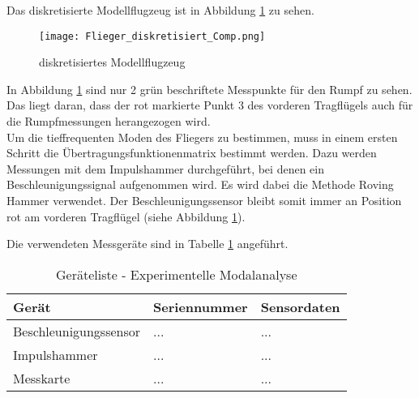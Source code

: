     \noindent
    Das diskretisierte Modellflugzeug ist in Abbildung
    \ref{fig: Flieger_diskretisiert} zu sehen.

    \begin{figure}[H]
        \centering
        \texttt{[image: Flieger\_diskretisiert\_Comp.png]}
        \caption{diskretisiertes Modellflugzeug}
        \label{fig: Flieger_diskretisiert}
    \end{figure}

    \noindent
    In Abbildung \ref{fig: Flieger_diskretisiert} sind nur 2 grün beschriftete
    Messpunkte für den Rumpf zu sehen. Das liegt daran, dass der rot markierte
    Punkt 3 des vorderen Tragflügels auch für die Rumpfmessungen herangezogen
    wird.
    \\

    \noindent
    Um die tieffrequenten Moden des Fliegers zu bestimmen, muss in einem ersten
    Schritt die Übertragungsfunktionenmatrix bestimmt werden. Dazu werden
    Messungen mit dem Impulshammer durchgeführt, bei denen ein
    Beschleunigungssignal aufgenommen wird. Es wird dabei die Methode Roving
    Hammer verwendet. Der Beschleunigungssensor bleibt somit immer an Position
     rot\grqq \hspace{0.05cm} am vorderen Tragflügel (siehe Abbildung
    \ref{fig: Flieger_diskretisiert}).

    \noindent
    Die verwendeten Messgeräte sind in Tabelle \ref{tab: Geräteliste_EMA}
    angeführt.

    \begin{table}[H]
        \centering
        \begin{tabular}{|l|l|l|}
            \hline
            \textbf{Gerät}  &   \textbf{Seriennummer}   &   \textbf{Sensordaten} \\
            \hline \hline
            Beschleunigungssensor & ... & ... \\
            \hline
            Impulshammer & ... & ... \\
            \hline
            Messkarte & ... & ... \\
            \hline
        \end{tabular}
        \caption{Geräteliste - Experimentelle Modalanalyse}
        \label{tab: Geräteliste_EMA}
    \end{table}    

